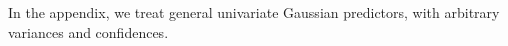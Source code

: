 \documentclass[twoside]{article}
\makeatletter
\theoremstyle{plain}
\theoremstyle{definition}
\newcommand\aar{\@ifstar\aar@one@star\aar@plain}
\newcommand\aar@one@star{\@ifstar\aar@resize{\aar@plain*}}
\newcommand\aar@resize[1]{\sbox{\aar@content}{#1}\scaleleftright[3.8ex]
			{\Biggl\langle\!\!\!\!\Biggl\langle}{\usebox{\aar@content}}
			{\Biggr\rangle\!\!\!\!\Biggr\rangle}}
\makeatother
\begin{document}
In the appendix, we treat general univariate
Gaussian predictors, with arbitrary variances and confidences.








\end{document}
